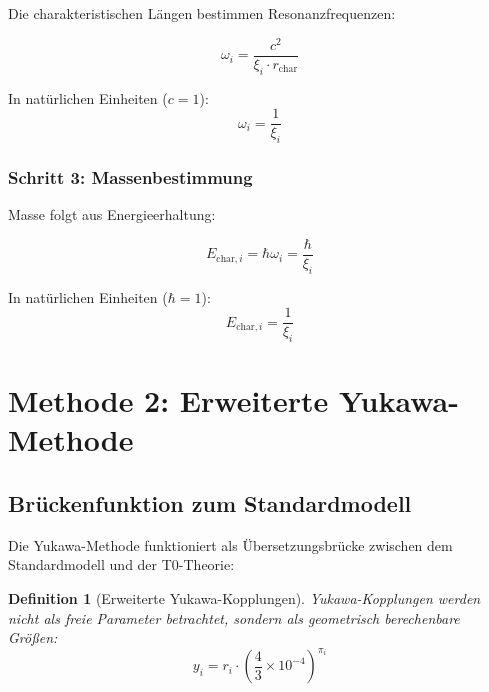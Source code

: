 \documentclass[12pt,a4paper]{article}
\newtheorem{definition}[theorem]{Definition}
\begin{document}
	Die charakteristischen Längen bestimmen Resonanzfrequenzen:
	
	\begin{equation}
		\omega_i = \frac{c^2}{\xi_i \cdot r_{\text{char}}}
		\label{eq:resonance_frequencies}
	\end{equation}
	
	In natürlichen Einheiten ($c = 1$):
	\begin{equation}
		\omega_i = \frac{1}{\xi_i}
		\label{eq:resonance_natural}
	\end{equation}
	
	\subsubsection{Schritt 3: Massenbestimmung}
	\label{subsubsec:step3}
	
	Masse folgt aus Energieerhaltung:
	
	\begin{equation}
		E_{\text{char},i} = \hbar \omega_i = \frac{\hbar}{\xi_i}
		\label{eq:energy_from_frequency}
	\end{equation}
	
	In natürlichen Einheiten ($\hbar = 1$):
	\begin{equation}
		\boxed{E_{\text{char},i} = \frac{1}{\xi_i}}
		\label{eq:characteristic_energy_direct}
	\end{equation}
	
	\section{Methode 2: Erweiterte Yukawa-Methode}
	\label{sec:yukawa_method}
	
	\subsection{Brückenfunktion zum Standardmodell}
	\label{subsec:bridge_function}
	
	Die Yukawa-Methode funktioniert als Übersetzungsbrücke zwischen dem Standardmodell und der T0-Theorie:
	
	\begin{definition}[Erweiterte Yukawa-Kopplungen]
		Yukawa-Kopplungen werden nicht als freie Parameter betrachtet, sondern als geometrisch berechenbare Größen:
		\begin{equation}
			y_i = r_i \cdot \left(\frac{4}{3} \times 10^{-4}\right)^{\pi_i}
			\label{eq:yukawa_couplings}
		\end{equation}
	\end{definition}
	
\end{document}
